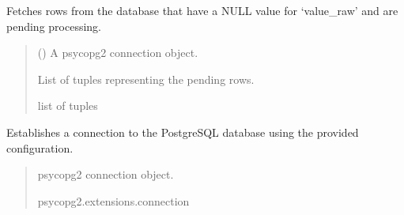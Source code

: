 \documentclass[letterpaper,10pt,english]{sphinxmanual}
\begin{document}
\begin{fulllineitems}
\label{\detokenize{modules.data_storage:modules.data_storage.llm_analyse.fetch_pending_rows}}
\pysigstartsignatures
\pysiglinewithargsret
{}
{}
{}
\pysigstopsignatures
\sphinxAtStartPar
Fetches rows from the database that have a NULL value for ‘value\_raw’ and are pending processing.
\begin{quote}\begin{description}
\sphinxAtStartPar
{} () \textendash{} A psycopg2 connection object.

\sphinxAtStartPar
List of tuples representing the pending rows.

\sphinxAtStartPar
list of tuples

\end{description}\end{quote}

\end{fulllineitems}


\begin{fulllineitems}
\label{\detokenize{modules.data_storage:modules.data_storage.llm_analyse.get_connection}}
\pysigstartsignatures
\pysiglinewithargsret
{}
{}
{}
\pysigstopsignatures
\sphinxAtStartPar
Establishes a connection to the PostgreSQL database using the provided configuration.
\begin{quote}\begin{description}
\sphinxAtStartPar
psycopg2 connection object.

\sphinxAtStartPar
psycopg2.extensions.connection

\end{description}\end{quote}

\end{fulllineitems}
\end{document}
